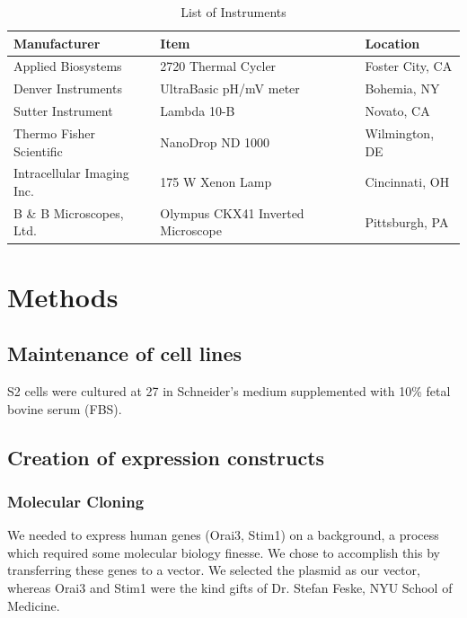 \begin{table}[!htb]
\caption{List of Instruments}
\begin{center}
\begin{tabular}{|l|l|l|}
\hline
Manufacturer & Item & Location \\ \hline \hline
Applied Biosystems & 2720 Thermal Cycler & Foster City, CA \\ \hline
Denver Instruments & UltraBasic pH/mV meter & Bohemia, NY \\ \hline
Sutter Instrument & Lambda 10-B & Novato, CA \\ \hline
Thermo Fisher Scientific & NanoDrop ND 1000 & Wilmington, DE \\ \hline
Intracellular Imaging Inc. & 175 W Xenon Lamp & Cincinnati, OH \\ \hline
B \& B Microscopes, Ltd. & Olympus CKX41 Inverted Microscope & Pittsburgh, PA \\ \hline 
\end{tabular}
\end{center}
\label{tab:instruments}
\end{table}%

\section{Methods}

\subsection{Maintenance of cell lines}
\droso{} S2 cells were cultured at 27 \textcelsius{} in Schneider's \droso{} medium supplemented with 10\% fetal bovine serum (FBS). 

\subsection{Creation of \droso{} expression constructs}

\subsubsection{Molecular Cloning}
We needed to express human genes (Orai3, Stim1) on a \droso{} background, a process which required some molecular biology finesse. We chose to accomplish this by transferring these genes to a \droso{} vector.  We selected the \puchygmt{} plasmid as our vector, whereas Orai3 and Stim1 were the kind gifts of Dr. Stefan Feske, NYU School of Medicine.

